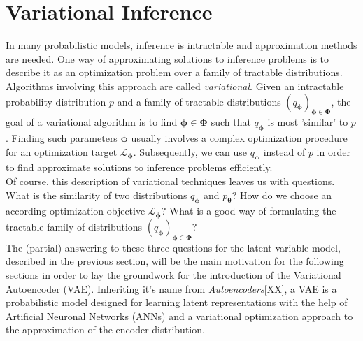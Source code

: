 \documentclass[12pt]{report}
\theoremstyle{definition}
\begin{document}
\section{Variational Inference}
In many probabilistic models, inference is intractable and approximation methods are needed. One way of approximating solutions to inference problems is to describe it as an optimization problem over a family of tractable distributions. Algorithms involving this approach are called \emph{variational}.
Given an intractable probability distribution $p$ and a family of tractable distributions $(q_{\pmb{\phi}})_{\pmb{\phi} \in \pmb{\Phi}}$, the goal of a variational algorithm is to find $\pmb{\phi} \in \pmb{\Phi}$ such that $q_{\pmb{\phi}}$ is most 'similar' to $p$. Finding such parameters $\pmb{\phi}$ usually involves a complex optimization procedure for an optimization target $\mathcal{L}_{\pmb{\phi}}$. Subsequently, we can use $q_{\pmb{\phi}}$ instead of $p$ in order to find approximate solutions to inference problems efficiently.\\
Of course, this description of variational techniques leaves us with questions. What is the similarity of two distributions $q_{\pmb{\phi}}$ and $p_{\pmb{\theta}}$? How do we choose an according optimization objective $\mathcal{L}_{\pmb{\phi}}$? What is a good way of formulating the tractable family of distributions $(q_{\pmb{\phi}})_{\pmb{\phi} \in \pmb{\Phi}}$? \\
The (partial) answering to these three questions for the latent variable model, described in the previous section, will be the main motivation for the following sections in order to lay the groundwork for the introduction of the Variational Autoencoder (VAE). Inheriting it's name from \emph{Autoencoders}[XX], a VAE is a probabilistic model designed for learning latent representations with the help of Artificial Neuronal Networks (ANNs) and a variational optimization approach to the approximation of the encoder distribution.
\end{document}
